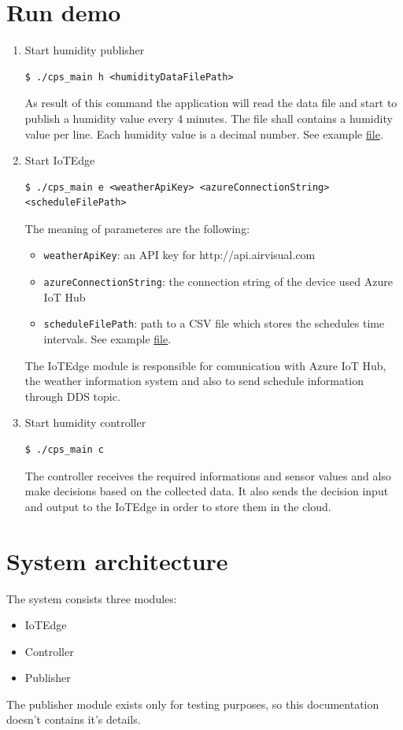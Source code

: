 \documentclass{article}
\begin{document}
\section{Run demo}
\begin{enumerate}
\item Start humidity publisher
\begin{verbatim}
$ ./cps_main h <humidityDataFilePath>
\end{verbatim}

As result of this command the application will read the data file and start to publish a humidity value every 4 minutes. The file shall contains a humidity value per line. Each humidity value is a decimal number. See example \href{https://github.com/antaljanosbenjamin/cps_homework/blob/master/examples/humidity.txt}{file}.
\item Start IoTEdge 
\begin{lstlisting}
$ ./cps_main e <weatherApiKey> <azureConnectionString> <scheduleFilePath>
\end{lstlisting} 
The meaning of parameteres are the following:
\begin{itemize}
\item \verb+weatherApiKey+: an API key for http://api.airvisual.com
\item \verb+azureConnectionString+: the connection string of the device used Azure IoT Hub
\item \verb+scheduleFilePath+: path to a CSV file which stores the schedules time intervals. See example \href{https://github.com/antaljanosbenjamin/cps_homework/blob/master/examples/schedule.csv}{file}.
\end{itemize}

The IoTEdge module is responsible for comunication with Azure IoT Hub, the weather information system and also to send schedule information through DDS topic.
\item Start humidity controller
\begin{verbatim}
$ ./cps_main c
\end{verbatim}

The controller receives the required informations and sensor values and also make decisions based on the collected data. It also sends the decision input and output to the IoTEdge in order to store them in the cloud.
\end{enumerate}
\section{System architecture}
The system consists three modules:
\begin{itemize}
\item IoTEdge
\item Controller
\item Publisher
\end{itemize}
The publisher module exists only for testing purposes, so this documentation doesn't contains it's details.
\end{document}
